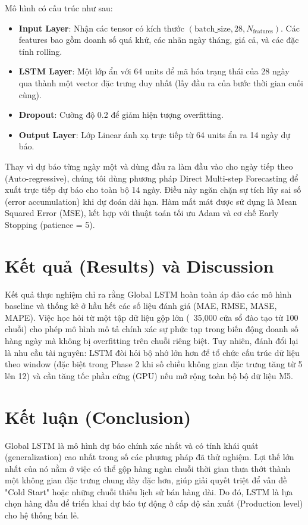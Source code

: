\documentclass{article}
\begin{document}
Mô hình có cấu trúc như sau:
\begin{itemize}
    \item \textbf{Input Layer}: Nhận các tensor có kích thước $(\text{batch\_size}, 28, N_{\text{features}})$. Các features bao gồm doanh số quá khứ, các nhãn ngày tháng, giá cả, và các đặc tính rolling.
    \item \textbf{LSTM Layer}: Một lớp ẩn với 64 units để mã hóa trạng thái của 28 ngày qua thành một vector đặc trưng duy nhất (lấy đầu ra của bước thời gian cuối cùng).
    \item \textbf{Dropout}: Cường độ 0.2 để giảm hiện tượng overfitting.
    \item \textbf{Output Layer}: Lớp Linear ánh xạ trực tiếp từ 64 units ẩn ra 14 ngày dự báo.
\end{itemize}

Thay vì dự báo từng ngày một và dùng đầu ra làm đầu vào cho ngày tiếp theo (Auto-regressive), chúng tôi dùng phương pháp Direct Multi-step Forecasting để xuất trực tiếp dự báo cho toàn bộ 14 ngày. Điều này ngăn chặn sự tích lũy sai số (error accumulation) khi dự đoán dài hạn. Hàm mất mát được sử dụng là Mean Squared Error (MSE), kết hợp với thuật toán tối ưu Adam và cơ chế Early Stopping (patience = 5).

\section{Kết quả (Results) và Discussion}
Kết quả thực nghiệm chỉ ra rằng Global LSTM hoàn toàn áp đảo các mô hình baseline và thống kê ở hầu hết các số liệu đánh giá (MAE, RMSE, MASE, MAPE). Việc học hỏi từ một tập dữ liệu gộp lớn (~35,000 cửa sổ đào tạo từ 100 chuỗi) cho phép mô hình mô tả chính xác sự phức tạp trong biến động doanh số hàng ngày mà không bị overfitting trên chuỗi riêng biệt. Tuy nhiên, đánh đổi lại là nhu cầu tài nguyên: LSTM đòi hỏi bộ nhớ lớn hơn để tổ chức cấu trúc dữ liệu theo window (đặc biệt trong Phase 2 khi số chiều không gian đặc trưng tăng từ 5 lên 12) và cần tăng tốc phần cứng (GPU) nếu mở rộng toàn bộ bộ dữ liệu M5.

\section{Kết luận (Conclusion)}
Global LSTM là mô hình dự báo chính xác nhất và có tính khái quát (generalization) cao nhất trong số các phương pháp đã thử nghiệm. Lợi thế lớn nhất của nó nằm ở việc có thể gộp hàng ngàn chuỗi thời gian thưa thớt thành một không gian đặc trưng chung dày đặc hơn, giúp giải quyết triệt để vấn đề "Cold Start" hoặc những chuỗi thiếu lịch sử bán hàng dài. Do đó, LSTM là lựa chọn hàng đầu để triển khai dự báo tự động ở cấp độ sản xuất (Production level) cho hệ thống bán lẻ.
\end{document}
